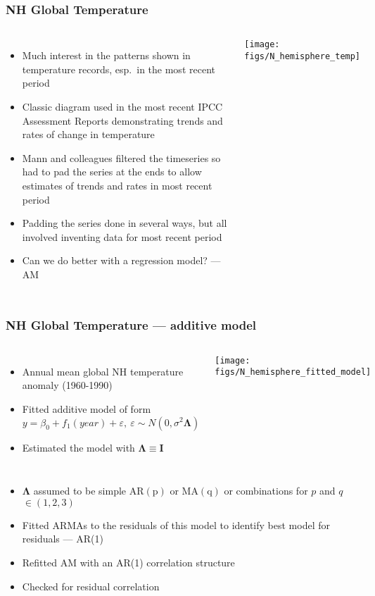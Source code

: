 \documentclass{beamer}
\begin{document}
\begin{frame}
    \frametitle{NH Global Temperature}
    \begin{columns}
        \column{7cm}
        \begin{itemize}
            \item Much interest in the patterns shown in temperature records, esp.~in the most recent period
            \item Classic diagram used in the most recent IPCC Assessment Reports demonstrating trends and rates of change in temperature
            \item Mann and colleagues filtered the timeseries so had to pad the series at the ends to allow estimates of trends and rates in most recent period
            \item Padding the series done in several ways, but all involved inventing data for most recent period
            \item Can we do better with a regression model? --- AM
        \end{itemize}
        
        \column{5cm}
        \texttt{[image: figs/N\_hemisphere\_temp]}
    \end{columns}
\end{frame}

\begin{frame}
    \frametitle{NH Global Temperature --- additive model}
    \begin{columns}
        \column{7cm}
        \begin{itemize}
            \item Annual mean global NH temperature anomaly (1960-1990)
            \item Fitted additive model of form
            $$y = \beta_0 + f_1(year) + \varepsilon, \: \varepsilon \sim N(0, \sigma^2\mathbf{\Lambda})$$
            \item Estimated the model with $\mathbf{\Lambda} \equiv \mathbf{I}$
        \end{itemize}
        
        \column{5cm}
        \texttt{[image: figs/N\_hemisphere\_fitted\_model]}
    \end{columns}
    \begin{itemize}
        \item $\mathbf{\Lambda}$ assumed to be simple $\mathrm{AR(p)}$ or $\mathrm{MA(q)}$ or combinations for $p$ and $q$ $\in (1, 2, 3)$
        \item Fitted ARMAs to the residuals of this model to identify best model for residuals --- AR(1)
        \item Refitted AM with an AR(1) correlation structure
        \item Checked for residual correlation
    \end{itemize}
\end{frame}
\end{document}

